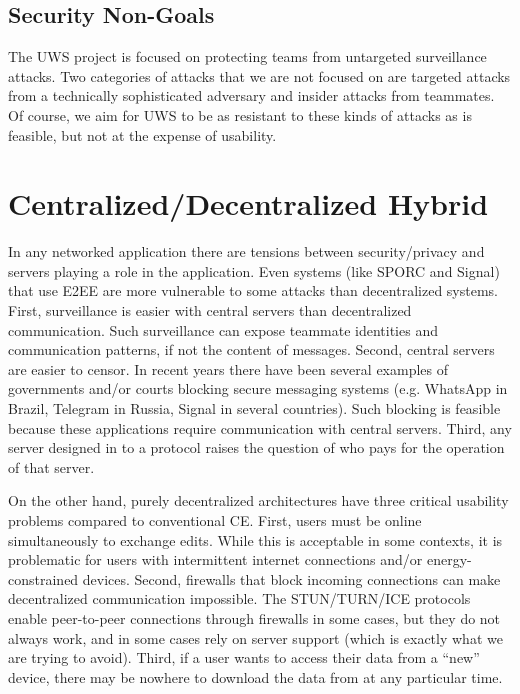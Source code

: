 \documentclass[runningheads]{llncs}
\begin{document}
\subsection{Security Non-Goals}

The UWS project is focused on protecting teams from untargeted surveillance attacks.
Two categories of attacks that we are not focused on are targeted attacks from a technically sophisticated adversary and insider attacks from teammates.
Of course, we aim for UWS to be as resistant to these kinds of attacks as is feasible, but not at the expense of usability.

\section{Centralized{\slash}Decentralized Hybrid}

In any networked application there are tensions between security{\slash}privacy and servers playing a role in the application.
Even systems (like SPORC and Signal) that use E2EE are more vulnerable to some attacks than decentralized systems.
First, surveillance is easier with central servers than decentralized communication.
Such surveillance can expose teammate identities and communication patterns, if not the content of messages.
Second, central servers are easier to censor.
In recent years there have been several examples of governments and{\slash}or courts blocking secure messaging systems (e.g. WhatsApp in Brazil, Telegram in Russia, Signal in several countries).
Such blocking is feasible because these applications require communication with central servers.
Third, any server designed in to a protocol raises the question of who pays for the operation of that server.

On the other hand, purely decentralized architectures have three critical usability problems compared to conventional CE.
First, users must be online simultaneously to exchange edits\footnotemark{}.
While this is acceptable in some contexts, it is problematic for users with intermittent internet connections and{\slash}or energy-constrained devices.
Second, firewalls that block incoming connections can make decentralized communication impossible.
The STUN{\slash}TURN{\slash}ICE protocols enable peer-to-peer connections through firewalls in some cases, but they do not always work, and in some cases rely on server support (which is exactly what we are trying to avoid).
Third, if a user wants to access their data from a ``new'' device, there may be nowhere to download the data from at any particular time.
\end{document}
